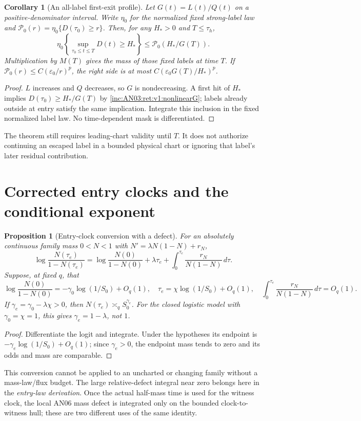 \documentclass[11pt]{article}
\numberwithin{equation}{section}
\newtheorem{proposition}[theorem]{Proposition}
\newtheorem{corollary}[theorem]{Corollary}
\theoremstyle{remark}\newtheorem{remark}[theorem]{Remark}
\newcommand{\dd}{\,d}
\newcommand{\1}{\mathbf 1}
\begin{document}
\begin{corollary}[An all-label first-exit profile]
\label{inc:AN03:ret:v1:exitprofile}
Let $G(t)=L(t)/Q(t)$ on a positive-denominator interval. Write
$\eta_0$ for the normalized fixed strong-label law and
$\mathcal P_0(r)=\eta_0\{D(\tau_0)\ge r\}$.
Then, for any $H_*>0$ and $T\le\tau_h$,
\begin{equation}\label{inc:AN03:ret:v1:exitmass}
 \eta_0\left\{\sup_{\tau_0\le t\le T}D(t)\ge H_*\right\}
 \le\mathcal P_0(H_*/G(T)).
\end{equation}
Multiplication by $M(T)$ gives the mass of those fixed labels at time
$T$. If $\mathcal P_0(r)\le C(\varepsilon_0/r)^p$, the right side is
at most $C(\varepsilon_0G(T)/H_*)^p$.
\end{corollary}
\begin{proof}
$L$ increases and $Q$ decreases, so $G$ is nondecreasing.
A first hit of $H_*$ implies $D(\tau_0)\ge H_*/G(T)$ by
\eqref{inc:AN03:ret:v1:nonlinearG}; labels already outside at entry
satisfy the same implication. Integrate this inclusion in the fixed
normalized label law. No time-dependent mask is differentiated.
\end{proof}
The theorem still requires leading-chart validity until $T$. It does not
authorize continuing an escaped label in a bounded physical chart or
ignoring that label's later residual contribution.

\section{Corrected entry clocks and the conditional exponent}
\label{inc:AN03:ret:v1:clocks}
\begin{proposition}[Entry-clock conversion with a defect]
\label{inc:AN03:ret:v1:clockconversion}
For an absolutely continuous family mass $0<N<1$ with
$N'=\lambda N(1-N)+r_N$,
\begin{equation}\label{inc:AN03:ret:v1:logit}
 \log\frac{N(\tau_e)}{1-N(\tau_e)}
 =\log\frac{N(0)}{1-N(0)}+\lambda\tau_e+
 \int_0^{\tau_e}\frac{r_N}{N(1-N)}\dd\tau.
\end{equation}
Suppose, at fixed $q$, that
\[
 \log\frac{N(0)}{1-N(0)}=-\gamma_0\log(1/S_0)+O_q(1),\quad
 \tau_e=\chi\log(1/S_0)+O_q(1),\quad
 \int_0^{\tau_e}\frac{r_N}{N(1-N)}\dd\tau=O_q(1).
\]
If $\gamma_e=\gamma_0-\lambda\chi>0$, then
$N(\tau_e)\asymp_q S_0^{\gamma_e}$.
For the closed logistic model with $\gamma_0=\chi=1$, this gives
$\gamma_e=1-\lambda$, not $1$.
\end{proposition}
\begin{proof}
Differentiate the logit and integrate. Under the hypotheses its endpoint
is $-\gamma_e\log(1/S_0)+O_q(1)$; since $\gamma_e>0$, the endpoint
mass tends to zero and its odds and mass are comparable.
\end{proof}
This conversion cannot be applied to an uncharted or changing family
without a mass-law/flux budget. The large relative-defect integral near
zero belongs here in the \emph{entry-law derivation}. Once the actual
half-mass time is used for the witness clock, the local AN06 mass defect
is integrated only on the bounded clock-to-witness hull; these are two
different uses of the same identity.
\end{document}
